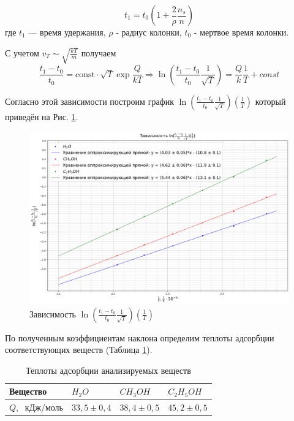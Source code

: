 \documentclass{article}
\begin{document}
    \begin{equation*}
        t_1 = t_0\left(1+\frac{2}{\rho}\frac{n_s}{n}\right)
    \end{equation*} где $t_1$ — время удержания, $\rho$ - радиус колонки, $t_0$ - мертвое время колонки. 

    С учетом $v_T\sim \sqrt{\frac{kT}{m}}$ получаем 
    \begin{equation*}
        \frac{t_1-t_0}{t_0} = \text{const}\cdot \sqrt{T}\exp{\frac{Q}{kT}} \Rightarrow \ln{\left(\frac{t_1-t_0}{t_0} \frac{1}{\sqrt{T}}\right)} = \frac{Q}{k}\frac{1}{T}+const
    \end{equation*}


    Согласно этой зависимости построим график $\ln{\left(\frac{t_1 - t_0}{t_0}\frac{1}{\sqrt{T}}\right)} \left(\frac{1}{T}\right)$ который приведён на Рис. \ref{fig:Рис 1}.

    \begin{figure}[h!]
    \centering
    \includegraphics[width=0.75\linewidth]{Images/Зависимость от температуры.png}
    \caption{Зависимость $\ln{\left(\frac{t_1 - t_0}{t_0}\frac{1}{\sqrt{T}}\right)} \left(\frac{1}{T}\right)$ }
    \label{fig:Рис 1}
    \end{figure}

    По полученным коэффициентам наклона определим теплоты адсорбции соответствующих веществ (Таблица \ref{Теплоты адсорбции}).

    \begin{table}[h!]
    \centering
    \caption{Теплоты адсорбции анализируемых веществ}
\begin{tabular}{|l|l|l|l|}
\hline
Вещество & $H_2O$ & $CH_3OH$ & $C_2H_5OH$ \\ \hline
$Q,\;$ кДж/моль & $33,5 \pm 0,4$ & $38,4 \pm 0,5$ & $45,2 \pm 0,5$ \\ \hline
\end{tabular}
\label{Теплоты адсорбции}
\end{table}
\end{document}

